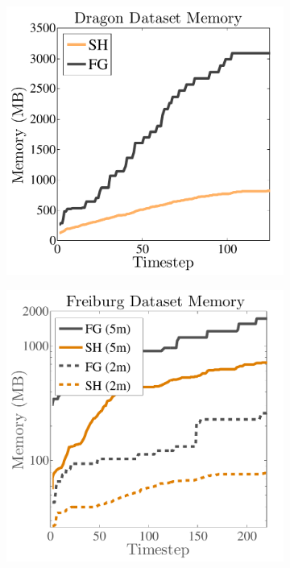 \documentclass[conference]{IEEEtran}
\begin{document}
\begin{figure}
  \centering
    \begin{minipage}{0.25\linewidth}
	 \begin{subfigure}{1.0\linewidth} \centering
			\includegraphics[width=1.0\textwidth]{img/memoryusage.pdf}
			 \caption{} 
			 \label{fig:memory_data}
		 \end{subfigure}  
		  \begin{subfigure}{1.0\linewidth} \centering
			\includegraphics[width=1.0\textwidth]{img/memoryusage2.pdf}

\end{subfigure}
\end{minipage}
\end{figure}
\end{document}
